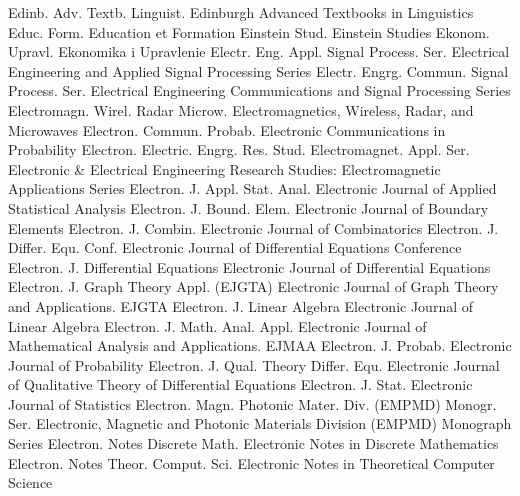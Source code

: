 {Edinb. Adv. Textb. Linguist.}
{Edinburgh Advanced Textbooks in Linguistics}
{Educ. Form.}
{Education et Formation}
{Einstein Stud.}
{Einstein Studies}
{Ekonom. Upravl.}
{Ekonomika i Upravlenie}
{Electr. Eng. Appl. Signal Process. Ser.}
{Electrical Engineering and Applied Signal Processing Series}
{Electr. Engrg. Commun. Signal Process. Ser.}
{Electrical Engineering Communications and Signal Processing Series}
{Electromagn. Wirel. Radar Microw.}
{Electromagnetics, Wireless, Radar, and Microwaves}
{Electron. Commun. Probab.}
{Electronic Communications in Probability}
{Electron. Electric. Engrg. Res. Stud. Electromagnet. Appl. Ser.}
{Electronic & Electrical Engineering Research Studies: Electromagnetic Applications Series}
{Electron. J. Appl. Stat. Anal.}
{Electronic Journal of Applied Statistical Analysis}
{Electron. J. Bound. Elem.}
{Electronic Journal of Boundary Elements}
{Electron. J. Combin.}
{Electronic Journal of Combinatorics}
{Electron. J. Differ. Equ. Conf.}
{Electronic Journal of Differential Equations Conference}
{Electron. J. Differential Equations}
{Electronic Journal of Differential Equations}
{Electron. J. Graph Theory Appl. (EJGTA)}
{Electronic Journal of Graph Theory and Applications. EJGTA}
{Electron. J. Linear Algebra}
{Electronic Journal of Linear Algebra}
{Electron. J. Math. Anal. Appl.}
{Electronic Journal of Mathematical Analysis and Applications. EJMAA}
{Electron. J. Probab.}
{Electronic Journal of Probability}
{Electron. J. Qual. Theory Differ. Equ.}
{Electronic Journal of Qualitative Theory of Differential Equations}
{Electron. J. Stat.}
{Electronic Journal of Statistics}
{Electron. Magn. Photonic Mater. Div. (EMPMD) Monogr. Ser.}
{Electronic, Magnetic and Photonic Materials Division (EMPMD) Monograph Series}
{Electron. Notes Discrete Math.}
{Electronic Notes in Discrete Mathematics}
{Electron. Notes Theor. Comput. Sci.}
{Electronic Notes in Theoretical Computer Science}
